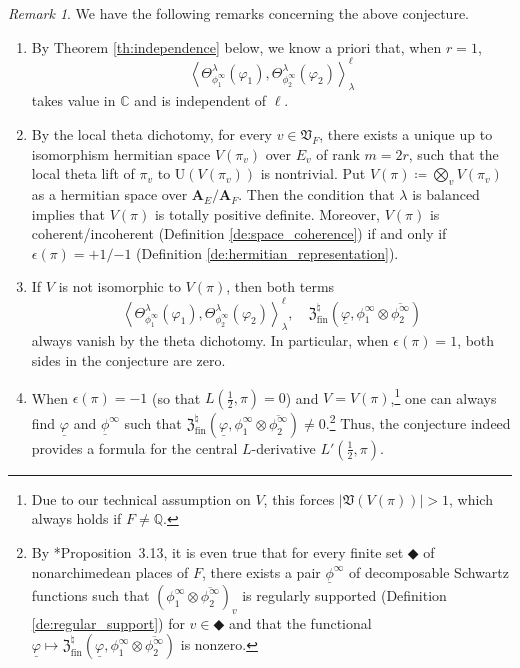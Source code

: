 \documentclass[12pt]{amsart}
\numberwithin{equation}{section}
\theoremstyle{plain}
\theoremstyle{definition}
\theoremstyle{remark}
\newtheorem{remark}[proposition]{Remark}
\renewcommand{\b}[1]{\mathbf{#1}}
\renewcommand{\d}[1]{\mathbb{#1}}
\newcommand{\f}[1]{\mathfrak{#1}}
\renewcommand{\r}[1]{\mathrm{#1}}
\renewcommand{\(}{\left(}
\renewcommand{\)}{\right)}
\newcommand{\ol}[1]{\overline{#1}{}}
\newcommand{\ul}{\underline}
\newcommand{\bA}{\b A}
\newcommand{\dC}{\d C}
\newcommand{\dQ}{\d Q}
\newcommand{\fV}{\f V}
\newcommand{\fZ}{\f Z}
\newcommand{\rU}{\r U}
\newcommand{\llangle}{\left\langle}
\newcommand{\rrangle}{\right\rangle}
\newcommand{\fin}{\r{fin}}
\begin{document}
\begin{remark}\label{re:dichotomy}
We have the following remarks concerning the above conjecture.
\begin{enumerate}
  \item By Theorem \ref{th:independence} below, we know a priori that, when $r=1$,
      \[
      \llangle\Theta_{\phi^\infty_1}^\lambda(\varphi_1),\Theta_{\phi^\infty_2}^\lambda(\varphi_2)\rrangle_\lambda^\ell
      \]
      takes value in $\dC$ and is independent of $\ell$.

  \item By the local theta dichotomy, for every $v\in\fV_F$, there exists a unique up to isomorphism hermitian space $V(\pi_v)$ over $E_v$ of rank $m=2r$, such that the local theta lift of $\pi_v$ to $\rU(V(\pi_v))$ is nontrivial. Put $V(\pi)\coloneqq\bigotimes_v V(\pi_v)$ as a hermitian space over $\bA_E/\bA_F$. Then the condition that $\lambda$ is balanced implies that $V(\pi)$ is totally positive definite. Moreover, $V(\pi)$ is coherent/incoherent (Definition \ref{de:space_coherence}) if and only if $\epsilon(\pi)=+1/{-1}$ (Definition \ref{de:hermitian_representation}).

  \item If $V$ is not isomorphic to $V(\pi)$, then both terms
      \[
      \llangle\Theta_{\phi^\infty_1}^\lambda(\varphi_1),\Theta_{\phi^\infty_2}^\lambda(\varphi_2)\rrangle_\lambda^\ell,\quad
      \fZ^\natural_\fin(\ul\varphi,\phi^\infty_1\otimes\ol{\phi^\infty_2})
      \]
      always vanish by the theta dichotomy. In particular, when $\epsilon(\pi)=1$, both sides in the conjecture are zero.

  \item When $\epsilon(\pi)=-1$ (so that $L(\tfrac{1}{2},\pi)=0$) and $V=V(\pi)$,\footnote{Due to our technical assumption on $V$, this forces $|\fV(V(\pi))|>1$, which always holds if $F\neq \dQ$.} one can always find $\ul\varphi$ and $\ul\phi^\infty$ such that $\fZ^\natural_\fin(\ul\varphi,\phi^\infty_1\otimes\ol{\phi^\infty_2})\neq 0$.\footnote{By \cite{LL21}*{Proposition~3.13}, it is even true that for every finite set $\Diamondblack$ of nonarchimedean places of $F$, there exists a pair $\ul\phi^\infty$ of decomposable Schwartz functions such that $(\phi^\infty_1\otimes\ol{\phi^\infty_2})_v$ is regularly supported (Definition \ref{de:regular_support}) for $v\in\Diamondblack$ and that the functional $\ul\varphi\mapsto\fZ^\natural_\fin(\ul\varphi,\phi^\infty_1\otimes\ol{\phi^\infty_2})$ is nonzero.} Thus, the conjecture indeed provides a formula for the central $L$-derivative $L'(\tfrac{1}{2},\pi)$.


\end{enumerate}
\end{remark}
\end{document}
